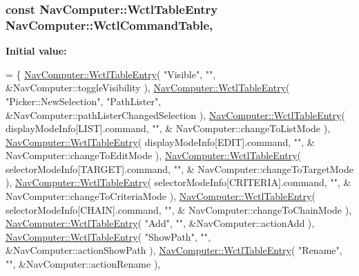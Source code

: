 \subsubsection[{\texorpdfstring{Wctl\+Command\+Table}{WctlCommandTable}}]{\setlength{\rightskip}{0pt plus 5cm}const {\bf Nav\+Computer\+::\+Wctl\+Table\+Entry} Nav\+Computer\+::\+Wctl\+Command\+Table\hspace{0.3cm}{\ttfamily [static]}, {\ttfamily [protected]}}\hypertarget{classNavComputer_a2ee3c121b860befd7d33b38ae9a80647}{}\label{classNavComputer_a2ee3c121b860befd7d33b38ae9a80647}
{\bfseries Initial value\+:}
\begin{DoxyCode}
= \{
    \hyperlink{structNavComputer_1_1WctlTableEntry}{NavComputer::WctlTableEntry}( \textcolor{stringliteral}{"Visible"},
                                 \textcolor{stringliteral}{""},
                                 &NavComputer::toggleVisibility ),
    \hyperlink{structNavComputer_1_1WctlTableEntry}{NavComputer::WctlTableEntry}( \textcolor{stringliteral}{"Picker::NewSelection"},
                                 \textcolor{stringliteral}{"PathLister"},
                                 &NavComputer::pathListerChangedSelection ),
    \hyperlink{structNavComputer_1_1WctlTableEntry}{NavComputer::WctlTableEntry}( displayModeInfo[LIST].command, \textcolor{stringliteral}{""}, &
      NavComputer::changeToListMode ),
    \hyperlink{structNavComputer_1_1WctlTableEntry}{NavComputer::WctlTableEntry}( displayModeInfo[EDIT].command, \textcolor{stringliteral}{""}, &
      NavComputer::changeToEditMode ),
    \hyperlink{structNavComputer_1_1WctlTableEntry}{NavComputer::WctlTableEntry}( selectorModeInfo[TARGET].command, \textcolor{stringliteral}{""}, &
      NavComputer::changeToTargetMode ),
    \hyperlink{structNavComputer_1_1WctlTableEntry}{NavComputer::WctlTableEntry}( selectorModeInfo[CRITERIA].command, \textcolor{stringliteral}{""}, &
      NavComputer::changeToCriteriaMode ),
    \hyperlink{structNavComputer_1_1WctlTableEntry}{NavComputer::WctlTableEntry}( selectorModeInfo[CHAIN].command, \textcolor{stringliteral}{""}, &
      NavComputer::changeToChainMode ),
    \hyperlink{structNavComputer_1_1WctlTableEntry}{NavComputer::WctlTableEntry}( \textcolor{stringliteral}{"Add"}, \textcolor{stringliteral}{""}, &NavComputer::actionAdd ),
    \hyperlink{structNavComputer_1_1WctlTableEntry}{NavComputer::WctlTableEntry}( \textcolor{stringliteral}{"ShowPath"}, \textcolor{stringliteral}{""}, &NavComputer::actionShowPath ),
    \hyperlink{structNavComputer_1_1WctlTableEntry}{NavComputer::WctlTableEntry}( \textcolor{stringliteral}{"Rename"}, \textcolor{stringliteral}{""}, &NavComputer::actionRename ),

\end{DoxyCode}
